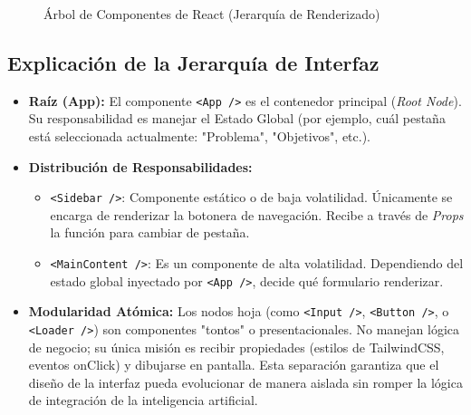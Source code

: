 \begin{figure}[ht]
\centering
{}
\caption{Árbol de Componentes de React (Jerarquía de Renderizado)}
\label{fig:jerarquia_componentes}
\end{figure}

\subsection{Explicación de la Jerarquía de Interfaz}
\begin{itemize}
    \item \textbf{Raíz (App):} El componente \texttt{<App />} es el contenedor principal (\textit{Root Node}). Su responsabilidad es manejar el Estado Global (por ejemplo, cuál pestaña está seleccionada actualmente: "Problema", "Objetivos", etc.).
    \item \textbf{Distribución de Responsabilidades:} 
    \begin{itemize}
        \item \texttt{<Sidebar />}: Componente estático o de baja volatilidad. Únicamente se encarga de renderizar la botonera de navegación. Recibe a través de \textit{Props} la función para cambiar de pestaña.
        \item \texttt{<MainContent />}: Es un componente de alta volatilidad. Dependiendo del estado global inyectado por \texttt{<App />}, decide qué formulario renderizar.
    \end{itemize}
    \item \textbf{Modularidad Atómica:} Los nodos hoja (como \texttt{<Input />}, \texttt{<Button />}, o \texttt{<Loader />}) son componentes "tontos" o presentacionales. No manejan lógica de negocio; su única misión es recibir propiedades (estilos de TailwindCSS, eventos onClick) y dibujarse en pantalla. Esta separación garantiza que el diseño de la interfaz pueda evolucionar de manera aislada sin romper la lógica de integración de la inteligencia artificial.
\end{itemize}
